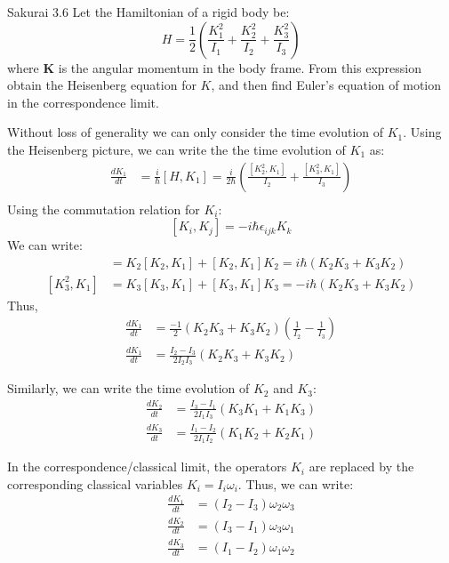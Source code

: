 \documentclass{article}
\newcommand{\bs}{\boldsymbol}
\begin{document}
\newpage
\begin{section}{Sakurai 3.6}
Let the Hamiltonian of a rigid body be:
$$
	H = \frac{1}{2} \left( \frac{K_1^2}{I_1} + \frac{K_2^2}{I_2} + \frac{K_3^2}{I_3} \right)
$$
where $\bs{K}$ is the angular momentum in the body frame. From this expression obtain the Heisenberg equation for $K$, and then find Euler's equation of motion in the correspondence limit.

\begin{tcolorbox}[breakable]
	Without loss of generality we can only consider the time evolution of $K_1$.
	Using the Heisenberg picture, we can write the the time evolution of $K_1$ as:
	\begin{align*}
		\frac{d K_1}{dt} & = \frac{i}{\hbar} [H, K_1] = \frac{i}{2\hbar} \left( \frac{[K_2^2, K_1]}{I_2} + \frac{[K_3^2, K_1]}{I_3} \right) \\
	\end{align*}
	Using the commutation relation for $K_i$:
	$$
		[K_i, K_j] = -i \hbar \epsilon_{ijk} K_k
	$$
	We can write:
	\begin{align*}
		[K_2^2, K_1] & = K_2 [K_2, K_1] + [K_2, K_1] K_2 = i \hbar (K_2K_3 + K_3K_2)  \\
		[K_3^2, K_1] & = K_3 [K_3, K_1] + [K_3, K_1] K_3 = -i \hbar (K_2K_3 + K_3K_2)
	\end{align*}
	Thus,
	\begin{align*}
		\frac{dK_1}{dt} & = \frac{-1}{2} (K_2K_3 + K_3 K_2) \left( \frac{1}{I_2} - \frac{1}{I_3} \right) \\
		\frac{dK_1}{dt} & = \frac{I_2 - I_3}{2I_2I_3} (K_2K_3 + K_3 K_2)
	\end{align*}

	Similarly, we can write the time evolution of $K_2$ and $K_3$:
	\begin{align*}
		\frac{dK_2}{dt} & = \frac{I_3 - I_1}{2I_1I_3} (K_3K_1 + K_1 K_3) \\
		\frac{dK_3}{dt} & = \frac{I_1 - I_2}{2I_1I_2} (K_1K_2 + K_2 K_1)
	\end{align*}

	In the correspondence/classical limit, the operators $K_i$ are replaced by the corresponding classical variables $K_i = I_i \omega_i$. Thus, we can write:
	\begin{align*}
		\frac{dK_1}{dt} & = (I_2 - I_3) \omega_2 \omega_3 \\
		\frac{dK_2}{dt} & = (I_3 - I_1) \omega_3 \omega_1 \\
		\frac{dK_3}{dt} & = (I_1 - I_2) \omega_1 \omega_2
	\end{align*}
\end{tcolorbox}
\end{section}
\end{document}
